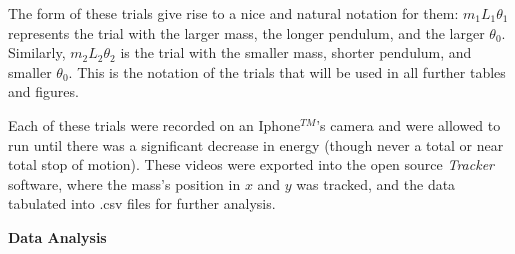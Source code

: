 \documentclass[11pt]{article}
\begin{document}
\begin{multicols}{2}
    The form of these trials give rise to a nice and natural notation for them: $m_1 L_1 \theta_1$ represents the trial with the larger mass, the longer pendulum, and the larger $\theta_0$. Similarly, $m_2 L_2 \theta_2$ is the trial with the smaller mass, shorter pendulum, and smaller $\theta_0$. This is the notation of the trials that will be used in all further tables and figures.

    Each of these trials were recorded on an Iphone$^{TM}$'s camera and were allowed to run until there was a significant decrease in energy (though never a total or near total stop of motion). These videos were exported into the open source \textit{Tracker} software, where the mass's position in $x$ and $y$ was tracked, and the data tabulated into .csv files for further analysis. 

    \vspace{10pt}

     \selectfont \textbf{Data Analysis}
    
     \selectfont 
    




\end{multicols}
\end{document}
